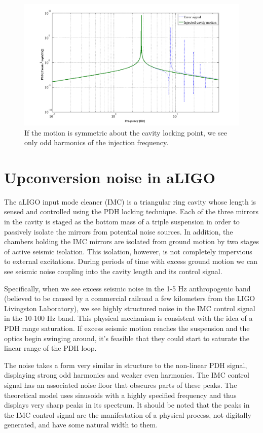 \begin{figure}[h!]
\includegraphics[height=0.6\textwidth]{figures/IMCUpconversion/symmetric_PDH.png}
\caption[PDH response to symmetric cavity motion]{If the motion is symmetric about the cavity locking point, we see only odd harmonics of the injection frequency.}
\end{figure}

\section{Upconversion noise in aLIGO}
The aLIGO input mode cleaner (IMC) is a triangular ring cavity whose length is sensed and controlled using the PDH locking technique. Each of the three mirrors in the cavity is staged as the bottom mass of a triple suspension in order to passively isolate the mirrors from  potential noise sources. In addition, the chambers holding the IMC mirrors are isolated from ground motion by two stages of active seismic isolation. This isolation, however, is not completely impervious to external excitations. During periods of time with excess ground motion we can see seismic noise coupling into the cavity length and its control signal.

Specifically, when we see excess seismic noise in the 1-5 Hz anthropogenic band (believed to be caused by a commercial railroad a few kilometers from the LIGO Livingston Laboratory), we see highly structured noise in the IMC control signal in the 10-100 Hz band. This physical mechanism is consistent with the idea of a PDH range saturation. If excess seismic motion reaches the suspension and the optics begin swinging around, it's feasible that they could start to saturate the linear range of the PDH loop.

The noise takes a form very similar in structure to the non-linear PDH signal, displaying strong odd harmonics and weaker even harmonics. The IMC control signal has an associated noise floor that obscures parts of these peaks. The theoretical model uses sinusoids with a highly specified frequency and thus displays very sharp peaks in its spectrum. It should be noted that the peaks in the IMC control signal are the manifestation of a physical process, not digitally generated, and have some natural width to them.

